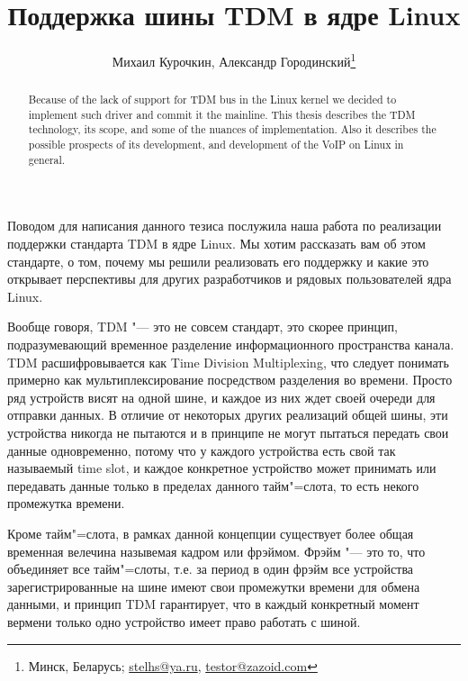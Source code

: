 \documentclass[10pt, a5paper]{article}
\begin{document}
\title{Поддержка шины TDM в ядре Linux}%

\author{Михаил Курочкин, Александр Городинский\footnote{Минск, Беларусь; \url{stelhs@ya.ru}, \url{testor@zazoid.com}}}
\maketitle

\begin{abstract}
Because of the lack of support for TDM bus in the Linux kernel we decided to implement such driver and commit it the mainline. This thesis describes the TDM technology, its scope, and some of the nuances of implementation. Also it describes the possible prospects of its development, and development of the VoIP on Linux in general.
\end{abstract}

Поводом для написания данного тезиса послужила наша работа по реализации
поддержки стандарта TDM в ядре Linux. Мы хотим рассказать вам об этом
стандарте, о том, почему мы решили реализовать его поддержку и какие это
открывает перспективы для других разработчиков и рядовых пользователей
ядра Linux.

Вообще говоря, TDM "--- это не совсем стандарт, это скорее принцип,
подразумевающий временное разделение информационного \linebreak пространства канала.
TDM расшифровывается как Time Division \linebreak Multiplexing, что следует понимать
примерно как мультиплексирование посредством разделения во времени. 
Просто ряд устройств висят на одной шине, и каждое из них ждет своей
очереди для отправки данных. В отличие от некоторых других реализаций
общей шины, эти устройства никогда не пытаются и в принципе не могут
пытаться передать свои данные одновременно, потому что у каждого
устройства есть свой так называемый time slot, и каждое конкретное
устройство может принимать или передавать данные только в пределах данного
тайм"=слота, то есть некого промежутка времени.

Кроме тайм"=слота, в рамках данной концепции существует более общая
временная велечина назывемая кадром или фрэймом. Фрэйм "--- это то, что
объединяет все тайм"=слоты, т.е. за период в один фрэйм все устройства
зарегистрированные на шине имеют свои промежутки времени для обмена
данными, и принцип TDM гарантирует, что в каждый конкретный момент вермени
только одно устройство имеет право работать с шиной.
\end{document}
